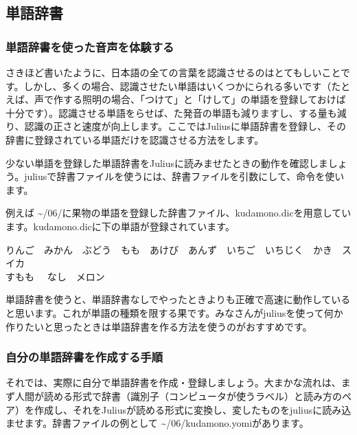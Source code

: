 \subsection{単語辞書}
\subsubsection{単語辞書を使った音声を体験する}
さきほど書いたように、日本語の全ての言葉を認識させるのはとてもしいことです。しかし、多くの場合、認識させたい単語はいくつかにられる多いです（たとえば、声で作する照明の場合、「つけて」と「けして」の単語を登録しておけば十分です）。認識させる単語をらせば、た発音の単語も減りますし、する量も減り、認識の正さと速度が向上します。ここではJuliusに単語辞書を登録し、その辞書に登録されている単語だけを認識させる方法をします。

少ない単語を登録した単語辞書をJuliusに読みませたときの動作を確認しましょう。juliusで辞書ファイルを使うには、辞書ファイルを引数にして、命令を使います。\\

例えば \textasciitilde /06/に果物の単語を登録した辞書ファイル、kudamono.dicを用意しています。kudamono.dicに下の単語が登録されています。
\begin{center}
	りんご　みかん　ぶどう　もも　あけび　あんず　いちご　いちじく　かき　スイカ\\すもも　	なし　メロン
\end{center}

単語辞書を使うと、単語辞書なしでやったときよりも正確で高速に動作していると思います。これが単語の種類を限する果です。みなさんがjuliusを使って何か作りたいと思ったときは単語辞書を作る方法を使うのがおすすめです。\\

\begin{tcolorbox}[title=\useOmetoi]
\begin{enumerate}
\end{enumerate}
\end{tcolorbox}

\subsubsection{自分の単語辞書を作成する手順}
それでは、実際に自分で単語辞書を作成・登録しましょう。大まかな流れは、まず人間が読める形式で辞書（識別子（コンピュータが使うラベル）と読み方のペア）を作成し、それをJuliusが読める形式に変換し、変したものをjuliusに読み込ませます。辞書ファイルの例として \textasciitilde /06/kudamono.yomiがあります。\\

